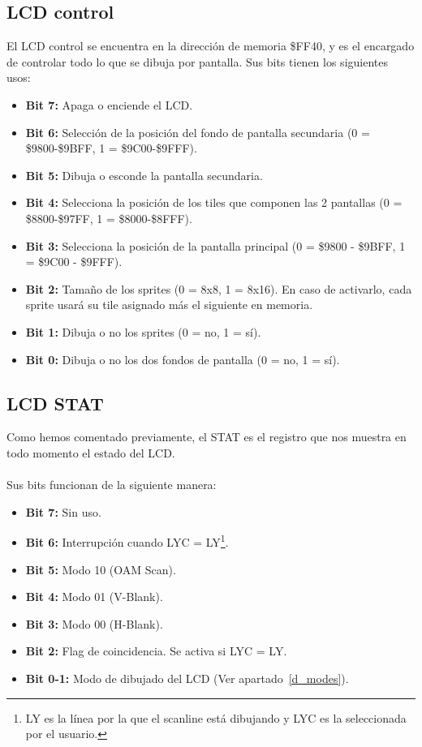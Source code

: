 \clearpage

\subsection{LCD control}

El LCD control se encuentra en la dirección de memoria \$FF40, y es el encargado de controlar todo lo que se dibuja por pantalla. Sus bits tienen los siguientes usos:

\begin{itemize}
	\item \textbf{Bit 7:} Apaga o enciende el LCD. 
	\item \textbf{Bit 6:} Selección de la posición del fondo de pantalla secundaria (0 = \$9800-\$9BFF, 1 = \$9C00-\$9FFF).
	\item \textbf{Bit 5:} Dibuja o esconde la pantalla secundaria.
	\item \textbf{Bit 4:} Selecciona la posición de los tiles que componen las 2 pantallas (0 = \$8800-\$97FF, 1 = \$8000-\$8FFF).
	\item \textbf{Bit 3:} Selecciona la posición de la pantalla principal (0 = \$9800 - \$9BFF, 1 = \$9C00 - \$9FFF).
	\item \textbf{Bit 2:} Tamaño de los sprites (0 = 8x8, 1 = 8x16). En caso de activarlo, cada sprite usará su tile asignado más el siguiente en memoria.
	\item \textbf{Bit 1:} Dibuja o no los sprites (0 = no, 1 = sí).
	\item \textbf{Bit 0:} Dibuja o no los dos fondos de pantalla (0 = no, 1 = sí).
\end{itemize}

\subsection{LCD STAT}

Como hemos comentado previamente, el STAT es el registro que nos muestra en todo momento el estado del LCD. 
\\ \\
Sus bits funcionan de la siguiente manera:

\begin{itemize}
	\item \textbf{Bit 7:} Sin uso.
	\item \textbf{Bit 6:} Interrupción cuando LYC = LY\footnote{LY es la línea por la que el scanline está dibujando y LYC es la seleccionada por el usuario.}.
	\item \textbf{Bit 5:} Modo 10 (OAM Scan).
	\item \textbf{Bit 4:} Modo 01 (V-Blank).
	\item \textbf{Bit 3:} Modo 00 (H-Blank).
	\item \textbf{Bit 2:} Flag de coincidencia. Se activa si LYC = LY.
	\item \textbf{Bit 0-1:} Modo de dibujado del LCD (Ver apartado~\ref{d_modes}).
\end{itemize}

